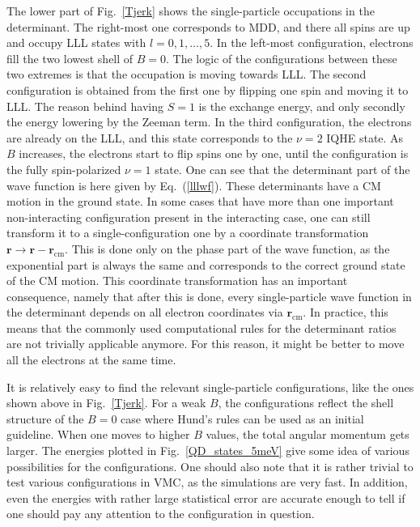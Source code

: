 \documentclass{article}
\begin{document}
The lower part of Fig.~\ref{Tjerk} shows the single-particle
occupations in the determinant. The right-most one corresponds to MDD,
and there all spins are up and occupy LLL states with
$l=0,1,\dots,5$. In the left-most configuration, electrons fill the
two lowest shell of $B=0$. The logic of the configurations between
these two extremes is that the occupation is moving towards LLL. The
second configuration is obtained from the first one by flipping one
spin and moving it to LLL. The reason behind having $S=1$ is the
exchange energy, and only secondly the energy lowering by the Zeeman
term. In the third configuration, the electrons are already on the
LLL, and this state corresponds to the $\nu=2$ IQHE state. As $B$
increases, the electrons start to flip spins one by one, until the
configuration is the fully spin-polarized $\nu=1$ state. One can see
that the determinant part of the wave function is here given by
Eq.~(\ref{lllwf}). These determinants have a CM motion in the ground
state. In some cases that have more than one important non-interacting
configuration present in the interacting case, one can still transform
it to a single-configuration one by a coordinate transformation
$\mathbf{r} \rightarrow
\mathbf{r}-\mathbf{r}_{\mathrm{cm}}$\cite{weakPRB}.  This is done only
on the phase part of the wave function, as the exponential part is
always the same and corresponds to the correct ground state of the CM
motion. This coordinate transformation has an important consequence,
namely that after this is done, every single-particle wave function in
the determinant depends on all electron coordinates via
$\mathbf{r}_{\mathrm{cm}}$. In practice, this means that the commonly
used computational rules for the determinant ratios are not trivially
applicable anymore. For this reason, it might be better to move all
the electrons at the same time.

It is relatively easy to find the relevant single-particle
configurations, like the ones shown above in Fig.~\ref{Tjerk}. For a
weak $B$, the configurations reflect the shell structure of the $B=0$
case where Hund's rules can be used as an initial guideline. When one
moves to higher $B$ values, the total angular momentum gets
larger. The energies plotted in Fig.~\ref{QD_states_5meV} give some
idea of various possibilities for the configurations. One should also
note that it is rather trivial to test various configurations in VMC,
as the simulations are very fast. In addition, even the energies with
rather large statistical error are accurate enough to tell if one
should pay any attention to the configuration in question.
\end{document}
